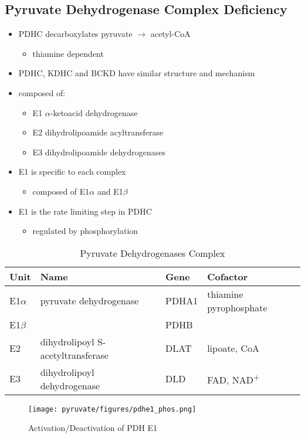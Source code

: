 \documentclass[12pt]{scrartcl}
\begin{document}
\subsection{Pyruvate Dehydrogenase Complex Deficiency}
\label{sec:org485dc67}
\begin{itemize}
\item PDHC decarboxylates pyruvate \(\to\) acetyl-CoA
\begin{itemize}
\item thiamine dependent
\end{itemize}
\item PDHC, KDHC and BCKD have similar structure and mechanism
\item composed of:
\begin{itemize}
\item E1 \(\alpha\)-ketoacid dehydrogenase
\item E2 dihydrolipoamide acyltransferase
\item E3 dihydrolipoamide dehydrogenases
\end{itemize}
\item E1 is specific to each complex
\begin{itemize}
\item composed of E1\(\alpha\) and E1\(\beta\)
\end{itemize}
\item E1 is the rate limiting step in PDHC
\begin{itemize}
\item regulated by phosphorylation
\end{itemize}
\end{itemize}

\begin{table}[htbp]
\caption{\label{tab:org9f84580}Pyruvate Dehydrogenases Complex}
\centering
\begin{tabular}{llll}
Unit & Name & Gene & Cofactor\\
\hline
E1\(\alpha\) & pyruvate dehydrogenase & PDHA1 & thiamine pyrophosphate\\
E1\(\beta\) &  & PDHB & \\
E2 & dihydrolipoyl  S-acetyltransferase & DLAT & lipoate, CoA\\
E3 & dihydrolipoyl dehydrogenase & DLD & FAD, NAD\textsuperscript{+}\\
\end{tabular}
\end{table}

\begin{figure}[htbp]
\centering
\texttt{[image: pyruvate/figures/pdhe1\_phos.png]}
\caption[pdhe1]{\label{fig:org26f8452}Activation/Deactivation of PDH E1}
\end{figure}
\end{document}
